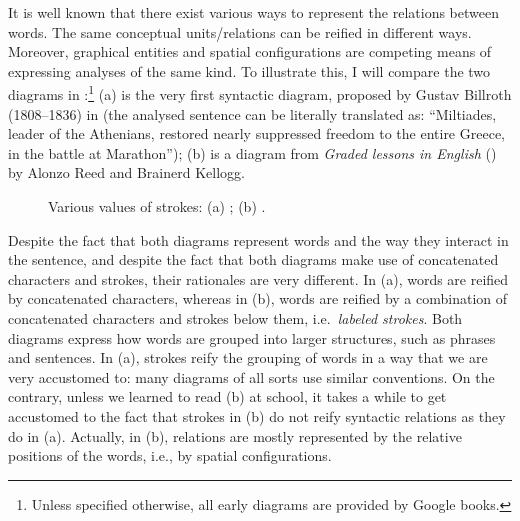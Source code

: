 \documentclass[output=paper]{langsci/langscibook}
\begin{document}
It is well known that there exist various ways to represent the relations between words. The same conceptual units/relations can be reified in different ways. Moreover, graphical entities and spatial configurations are competing means of expressing analyses of the same kind. To illustrate this, I will compare the two diagrams in :\footnote{Unless specified otherwise, all early diagrams are provided by Google books.} (a) is the very first syntactic diagram, proposed by Gustav Billroth (1808–1836) in \citeyear{billroth__lateinische_1832} (the analysed sentence can be literally translated as: “Miltiades, leader of the Athenians, restored nearly suppressed freedom to the entire Greece, in the battle at Marathon”); (b) is a diagram from \textit{Graded lessons in English} (\citeyear{reed_graded_1879}) by Alonzo Reed and Brainerd Kellogg.

\begin{figure}
%         
    \caption{Various values of strokes: (a) \citet[102]{billroth__lateinische_1832}; (b) \citet[62]{reed_graded_1879}.\label{fig:4:2}}
\end{figure}

Despite the fact that both diagrams represent words and the way they interact in the sentence, and despite the fact that both diagrams make use of concatenated characters and strokes, their rationales are very different. In (a), words are reified by concatenated characters, whereas in (b), words are reified by a combination of concatenated characters and strokes below them, i.e.~\textit{labeled strokes}. Both diagrams express how words are grouped into larger structures, such as phrases and sentences. In (a), strokes reify the grouping of words in a way that we are very accustomed to: many diagrams of all sorts use similar conventions. On the contrary, unless we learned to read (b) at school, it takes a while to get accustomed to the fact that strokes in (b) do not reify syntactic relations as they do in (a). Actually, in (b), relations are mostly represented by the relative positions of the words, i.e., by spatial configurations.
\end{document}
